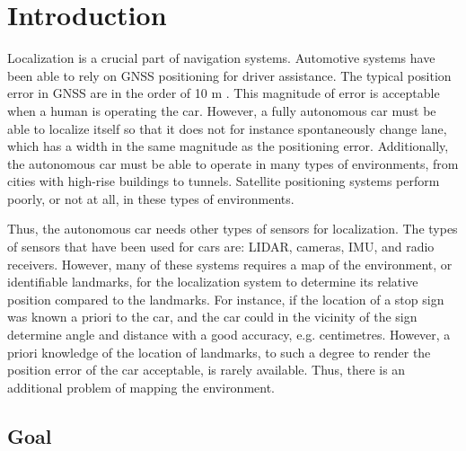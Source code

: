 \section{Introduction}

Localization is a crucial part of navigation systems. Automotive
systems have been able to rely on \gls{GNSS} positioning for driver assistance. 
The typical position error in \gls{GNSS} are in the
order of 10 m \cite{4770175}. This magnitude of error is acceptable when a human is operating the car.
However, a fully autonomous car must be able to localize itself so that it does not for instance spontaneously change lane, which has a width in the same magnitude as the positioning error. Additionally, the autonomous car must be able to operate in many types of environments, from cities with high-rise buildings to tunnels. Satellite positioning systems perform poorly, or not at all, in these types of environments. 

Thus, the autonomous car needs other types of sensors for localization. The types of sensors that have been used for cars are: \gls{LIDAR}, cameras, \gls{IMU}, and radio receivers. However, many of these systems requires a map of the environment, or identifiable landmarks, for the localization system to determine its relative position compared to the landmarks. For instance, if the location of a stop sign was known a priori to the car, and the car could in the vicinity of the sign determine angle and distance with a good accuracy, e.g. centimetres. However, a priori knowledge of the location of landmarks, to such a degree to render the position error of the car acceptable, is rarely available. Thus, there is an additional problem of mapping the environment.

\subsection{Goal}

